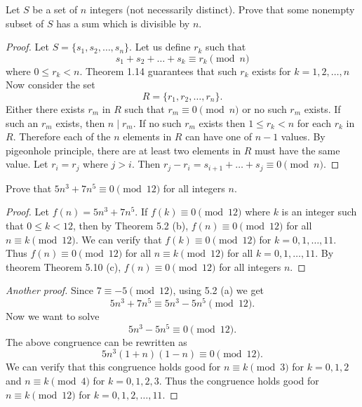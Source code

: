 \begin{exercise}{5.1}
  Let \( S \) be a set of \( n \) integers (not necessarily distinct).
  Prove that some nonempty subset of \( S \) has a sum which is
  divisible by \( n \).
\end{exercise}

\begin{proof}
  Let \( S = \{ s_1, s_2, \dots, s_n \} \). Let us define \( r_k \)
  such that
  \[
  s_1 + s_2 + \dots + s_k \equiv r_k \pmod{n}
  \]
  where \( 0 \le r_k < n \). Theorem 1.14 guarantees that such \( r_k
  \) exists for \( k = 1, 2, \dots, n \) Now consider the set
  \[
  R = \{ r_1, r_2, \dots, r_n \}.
  \]
  Either there exists \( r_m \) in \( R \) such that \( r_m \equiv 0
  \pmod{n} \) or no such \( r_m \) exists. If such an \( r_m \)
  exists, then \( n \mid r_m \). If no such \( r_m \) exists then \( 1
  \le r_k < n \) for each \( r_k \) in \( R \). Therefore each of the
  \( n \) elements in \( R \) can have one of \( n - 1 \) values. By
  pigeonhole principle, there are at least two elements in \( R \)
  must have the same value. Let \( r_i = r_j \) where \( j > i \).
  Then \( r_j - r_i = s_{i + 1} + \dots + s_{j} \equiv 0
  \pmod{n} \).
\end{proof}


\begin{exercise}{5.2}
  Prove that \( 5n^3 + 7n^5 \equiv 0 \pmod{12} \) for all integers \( n \).
\end{exercise}

\begin{proof}
  Let \( f(n) = 5n^3 + 7n^5 \). If \( f(k) \equiv 0 \pmod{12} \) where
  \( k \) is an integer such that \( 0 \le k < 12 \), then by Theorem
  5.2 (b), \( f(n) \equiv 0 \pmod{12} \) for all \( n \equiv k
  \pmod{12} \). We can verify that \( f(k) \equiv 0 \pmod{12} \) for
  \( k = 0, 1, \dots, 11 \). Thus \( f(n) \equiv 0 \pmod{12} \) for
  all \( n \equiv k \pmod{12} \) for all \( k = 0, 1, \dots, 11 \). By
  theorem Theorem 5.10 (c), \( f(n) \equiv 0 \pmod{12} \) for all
  integers \( n \).
\end{proof}

\begin{proof}[Another proof]
  Since \( 7 \equiv -5 \pmod{12} \), using 5.2 (a) we get
  \[ 5n^3 + 7n^5 \equiv 5n^3 - 5n^5 \pmod{12}. \]
  Now we want to solve
  \[ 5n^3 - 5n^5 \equiv 0 \pmod{12}. \]
  The above congruence can be rewritten as
  \[ 5n^3 (1 + n) (1 - n) \equiv 0 \pmod{12}. \]
  We can verify that this congruence holds good for \( n \equiv k
  \pmod{3} \) for \( k = 0, 1, 2 \) and \( n \equiv k \pmod{4} \) for
  \( k = 0, 1, 2, 3 \). Thus the congruence holds good for \( n \equiv
  k \pmod{12} \) for \( k = 0, 1, 2, \dots, 11 \).
\end{proof}


